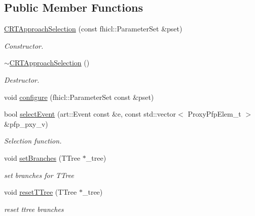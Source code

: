 \subsection*{Public Member Functions}
\begin{DoxyCompactItemize}
\item 
\hyperlink{classselection_1_1CRTApproachSelection_ae8b705a69ee56ed6bafb37528344be85}{C\-R\-T\-Approach\-Selection} (const fhicl\-::\-Parameter\-Set \&pset)
\begin{DoxyCompactList}\small\item\em Constructor. \end{DoxyCompactList}\item 
\hypertarget{classselection_1_1CRTApproachSelection_a1ea085fa9ab18fdecbb863a25cea5eb1}{\hyperlink{classselection_1_1CRTApproachSelection_a1ea085fa9ab18fdecbb863a25cea5eb1}{$\sim$\-C\-R\-T\-Approach\-Selection} ()}\label{classselection_1_1CRTApproachSelection_a1ea085fa9ab18fdecbb863a25cea5eb1}

\begin{DoxyCompactList}\small\item\em Destructor. \end{DoxyCompactList}\item 
void \hyperlink{classselection_1_1CRTApproachSelection_a95cea2d1bd14aa512b6d4c04059d5711}{configure} (fhicl\-::\-Parameter\-Set const \&pset)
\item 
bool \hyperlink{classselection_1_1CRTApproachSelection_a9dffc74d919ac0586d57c1de740f4ce9}{select\-Event} (art\-::\-Event const \&e, const std\-::vector$<$ Proxy\-Pfp\-Elem\-\_\-t $>$ \&pfp\-\_\-pxy\-\_\-v)
\begin{DoxyCompactList}\small\item\em Selection function. \end{DoxyCompactList}\item 
\hypertarget{classselection_1_1CRTApproachSelection_aa60ae2b3ee3f7776a3c35ed2a6aa8bea}{void \hyperlink{classselection_1_1CRTApproachSelection_aa60ae2b3ee3f7776a3c35ed2a6aa8bea}{set\-Branches} (T\-Tree $\ast$\-\_\-tree)}\label{classselection_1_1CRTApproachSelection_aa60ae2b3ee3f7776a3c35ed2a6aa8bea}

\begin{DoxyCompactList}\small\item\em set branches for T\-Tree \end{DoxyCompactList}\item 
\hypertarget{classselection_1_1CRTApproachSelection_a73491b9748240f8d5185482fe5e1d6a9}{void \hyperlink{classselection_1_1CRTApproachSelection_a73491b9748240f8d5185482fe5e1d6a9}{reset\-T\-Tree} (T\-Tree $\ast$\-\_\-tree)}\label{classselection_1_1CRTApproachSelection_a73491b9748240f8d5185482fe5e1d6a9}

\begin{DoxyCompactList}\small\item\em reset ttree branches \end{DoxyCompactList}\end{DoxyCompactItemize}
